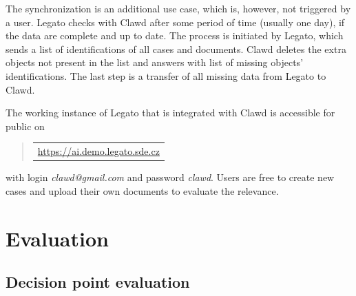 \documentclass[
  digital, %
  notable,   %
  nolof,     %
  nolot,     %
]{fithesis3}
\begin{document}
The synchronization is an additional use case, which is, however, not triggered by a user.
Legato checks with Clawd after some period of time (usually one day), if the data are complete and up to date.
The process is initiated by Legato, which sends a list of identifications of all cases and documents.
Clawd deletes the extra objects not present in the list and answers with list of missing objects' identifications.
The last step is a transfer of all missing data from Legato to Clawd.

The working instance of Legato that is integrated with Clawd is accessible for public on 
\begin{quote}
\begin{tabular}{|>{\centering\arraybackslash} m{10cm}|}
\hline
\vspace{2mm}
\url{https://ai.demo.legato.sde.cz}
\vspace{2mm}
\hrulefill
\end{tabular}
\end{quote}
with login \textit{clawd@gmail.com} and password \textit{clawd}.
Users are free to create new cases and upload their own documents to evaluate the relevance.



\chapter{Evaluation}
\label{chp:evaluation}

\section{Decision point evaluation}
\end{document}
